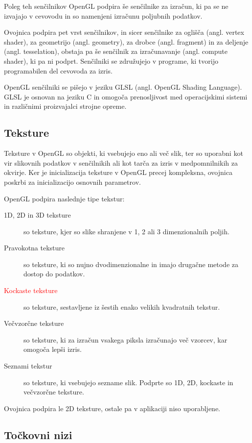 \documentclass[a4paper, 12pt]{book}
\begin{document}
Poleg teh senčilnikov OpenGL podpira še senčilnike za izračun, ki pa se ne izvajajo v cevovodu in so namenjeni izračunu poljubnih podatkov.

Ovojnica podpira pet vrst senčilnikov, in sicer senčilnike za oglišča (angl. vertex shader), za geometrijo (angl. geometry), za drobce (angl. fragment) in za deljenje (angl. tesselation), obstaja pa še senčilnik za izračunavanje (angl. compute shader), ki pa ni podprt. Senčilniki se združujejo v programe, ki tvorijo programabilen del cevovoda za izris.

OpenGL senčilniki se pišejo v jeziku GLSL\cite{GLSL} (angl. OpenGL Shading Language). GLSL je osnovan na jeziku C in omogoča prenosljivost med operacijskimi sistemi in različnimi proizvajalci strojne opreme.

\subsection*{Teksture}

Teksture v OpenGL so objekti, ki vsebujejo eno ali več slik, ter so uporabni kot vir slikovnih podatkov v senčilnikih ali kot tarča za izris v medpomnilnikih za okvirje. Ker je inicializacija teksture v OpenGL precej kompleksna, ovojnica poskrbi za inicializacijo osnovnih parametrov.

OpenGL podpira naslednje tipe tekstur:

\begin{description}
\item [1D, 2D in 3D teksture]so teksture, kjer so slike shranjene v 1, 2 ali 3 dimenzionalnih poljih.
\item [Pravokotna teksture]so teksture, ki so nujno dvodimenzionalne in imajo drugačne metode za dostop do podatkov.
\item [\textcolor{red}{Kockaste teksture}]so teksture, sestavljene iz šestih enako velikih kvadratnih tekstur.
\item [Večvzorčne teksture]so teksture, ki za izračun vsakega piksla izračunajo več vzorcev, kar omogoča lepši izris.
\item [Seznami tekstur]so teksture, ki vsebujejo sezname slik. Podprte so 1D, 2D, kockaste in večvzorčne teksture.
\end{description}

Ovojnica podpira le 2D teksture, ostale pa v aplikaciji niso uporabljene.

\subsection*{Točkovni nizi}
\end{document}
